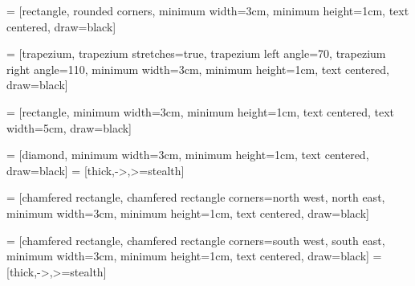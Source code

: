 \usepackage{tikz}
\usepackage{tkz-base}
\usetikzlibrary{quotes,angles}
\usetikzlibrary {arrows.meta}
\usetikzlibrary{calc}
\usetikzlibrary{shapes.geometric, shapes.misc, arrows}

 = [rectangle, rounded corners, 
minimum width=3cm, 
minimum height=1cm,
text centered, 
draw=black]

 = [trapezium, 
trapezium stretches=true, %
trapezium left angle=70, 
trapezium right angle=110, 
minimum width=3cm, 
minimum height=1cm, text centered, 
draw=black]

 = [rectangle, 
minimum width=3cm, 
minimum height=1cm, 
text centered, 
text width=5cm, 
draw=black]

 = [diamond, 
minimum width=3cm, 
minimum height=1cm, 
text centered, 
draw=black]
 = [thick,->,>=stealth]

 = [chamfered rectangle, 
chamfered rectangle corners={north west, north east},
minimum width=3cm, 
minimum height=1cm, 
text centered, 
draw=black]

 = [chamfered rectangle, 
chamfered rectangle corners={south west, south east},
minimum width=3cm, 
minimum height=1cm, 
text centered, 
draw=black]
 = [thick,->,>=stealth]